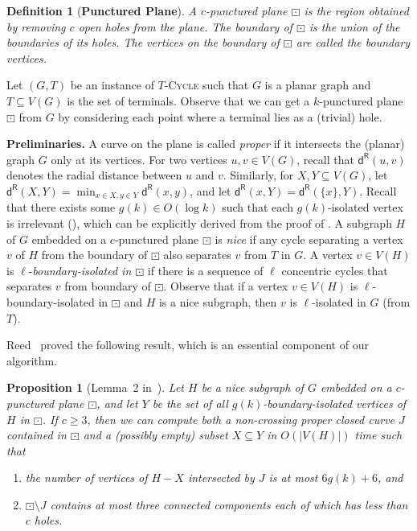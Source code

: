 \documentclass{article}
\newtheorem{proposition}[theorem]{Proposition}
\newtheorem{definition}[theorem]{Definition}
\numberwithin{claimcounter}{lemma}
\newcommand{\tcycle}{$T$-\textsc{Cycle}\xspace}
\begin{document}
\begin{definition}[{\bf Punctured Plane}]
    A $c${\em-punctured plane} $\boxdot$ is the region obtained by removing $c$ open holes from the plane. The \textit{boundary} of $\boxdot$ is the union of the boundaries of its holes. The vertices on the boundary of $\boxdot$ are called the {\em boundary vertices}.
\end{definition}

Let $(G,T)$ be an instance of \tcycle such that $G$ is a planar graph and $T\subseteq V(G)$ is the set of terminals. Observe that we can get a $k$-punctured plane $\boxdot$ from $G$ by considering each point where a terminal lies as a (trivial) hole.  



\medskip
\noindent\textbf{Preliminaries.} A curve on the plane is called \textit{proper} if it intersects the (planar) graph $G$ only at its vertices. For two vertices $u,v \in V(G)$, recall that $\mathsf{d^R}(u,v)$ denotes the radial distance between $u$ and $v$.
Similarly, for $X,Y \subseteq V(G)$, let $\mathsf{d^R}(X,Y) = \min_{x\in X, y\in Y} \mathsf{d^R}(x,y)$, and let $\mathsf{d^R}(x,Y)= \mathsf{d^R}(\{x\},Y)$. 
Recall that there exists some $g(k) \in O(\log k)$ such that each $g(k)$-isolated vertex  is irrelevant (), which can be explicitly derived from the proof of . A subgraph $H$ of $G$ embedded on a $c$-punctured plane $\boxdot$ is \textit{nice} if any cycle  separating a vertex $v$ of $H$ from the boundary of $\boxdot$ also separates $v$ from $T$ in $G$.
A vertex $v\in V(H)$ is $\ell$-{\em boundary-isolated in $\boxdot$} if there is a sequence of $\ell$ concentric cycles that separates $v$ from boundary of $\boxdot$.  Observe that if a vertex $v\in V(H)$  is $\ell$-boundary-isolated in $\boxdot$ and $H$ is a nice subgraph, then $v$ is $\ell$-isolated in $G$ (from $T$). 



Reed~\cite{reedLinear} proved the following result, which is an essential component of our algorithm.
\begin{proposition}[Lemma~2 in~\cite{reedLinear}]\label{P:reed}
Let $H$ be a nice subgraph of $G$ embedded on a $c$-punctured plane $\boxdot$, and let $Y$ be the set of all $g(k)$-boundary-isolated vertices of $H$ in $\boxdot$. If $c\geq3$, then we can compute both a non-crossing proper closed curve $J$ contained in $\boxdot$ and a (possibly empty) subset $X\subseteq Y$ in $O(|V(H)|)$ time such that
    \begin{enumerate}
        \item the number of vertices of $H-X$ intersected by $J$ is at most $6g(k)+6$, and
        \item $\boxdot \setminus J$ contains at most three connected components each of which has less than $c$ holes.  
    \end{enumerate}
\end{proposition}
\end{document}
